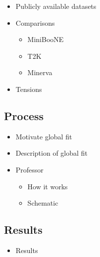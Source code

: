 \begin{itemize}
    \item Publicly available datasets
    \item Comparisons
    \begin{itemize}
        \item MiniBooNE
        \item T2K
        \item Minerva
    \end{itemize}
    \item Tensions
\end{itemize}

\subsection{Process}
\begin{itemize}
    \item Motivate global fit
    \item Description of global fit
    \item Professor
    \begin{itemize}
        \item How it works
        \item Schematic
    \end{itemize}
\end{itemize}

\subsection{Results}
\begin{itemize}
    \item Results 
\end{itemize}



\clearpage
